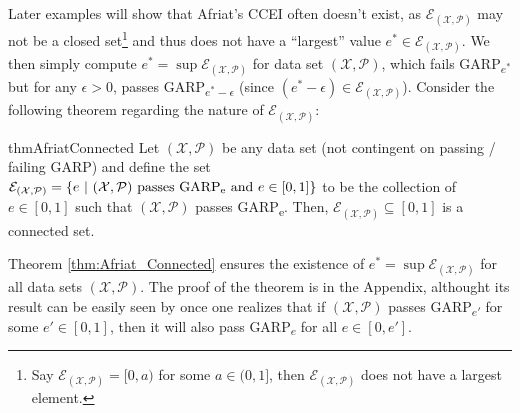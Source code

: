 \documentclass{article} %
\theoremstyle{style1}
\theoremstyle{style1}
\theoremstyle{example}
\begin{document}
Later examples will show that Afriat's CCEI often doesn't exist, as $\mathcal{E}_{(\mathcal{X},\mathcal{P})}$ may not be a closed set\footnote{Say $\mathcal{E}_{(\mathcal{X},\mathcal{P})}=[0,a)$ for some $a\in(0,1]$, then $\mathcal{E}_{(\mathcal{X},\mathcal{P})}$ does not have a largest element.} and thus does not have a ``largest'' value $e^*\in\mathcal{E}_{(\mathcal{X},\mathcal{P})}$. We then simply compute $e^*=\sup \mathcal{E}_{(\mathcal{X},\mathcal{P})}$ for data set $(\mathcal{X},\mathcal{P})$, which fails GARP\textsubscript{$e^*$} but for any $\epsilon>0$, passes GARP\textsubscript{$e^*-\epsilon$} (since $(e^*-\epsilon)\in \mathcal{E}_{(\mathcal{X},\mathcal{P})}$). Consider the following theorem regarding the nature of $\mathcal{E}_{(\mathcal{X},\mathcal{P})}$:

\begin{restatable}{thm}{AfriatConnected}\label{thm:Afriat_Connected}
Let $(\mathcal{X},\mathcal{P})$ be any data set (not contingent on passing / failing GARP) and define the set $\mathcal{E}_{(\mathcal{X},\mathcal{P})}=\{e\ |\ (\mathcal{X},\mathcal{P})\textrm{ passes GARP\textsubscript{e}}\textrm{ and } e\in[0,1]\}$ to be the collection of $e\in[0,1]$ such that $(\mathcal{X},\mathcal{P})$ passes GARP\textsubscript{e}. Then, $\mathcal{E}_{(\mathcal{X},\mathcal{P})}\subseteq[0,1]$ is a connected set.
\end{restatable}

Theorem \ref{thm:Afriat_Connected} ensures the existence of $e^*=\sup \mathcal{E}_{(\mathcal{X},\mathcal{P})}$ for all data sets $(\mathcal{X},\mathcal{P})$. The proof of the theorem is in the Appendix, althought its result can be easily seen by once one realizes that if $(\mathcal{X},\mathcal{P})$ passes GARP\textsubscript{$e'$} for some $e'\in[0,1]$, then it will also pass GARP\textsubscript{$e$} for all $e\in[0,e']$.
\end{document}
